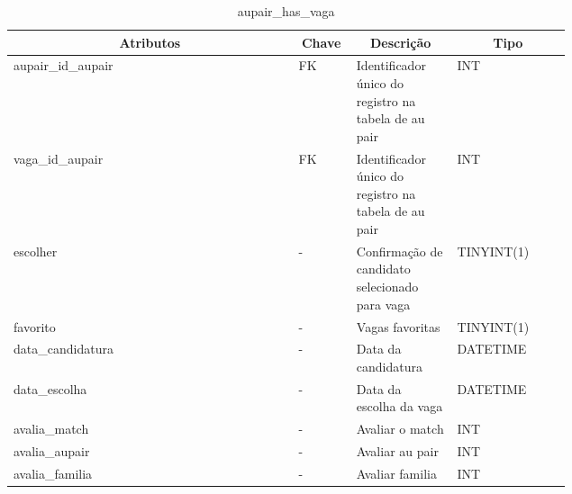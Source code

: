 \begin{enumerate}
    \begin{table}[H]
    \caption{aupair\_has\_vaga}
    \label{idioma}
    	\centering\footnotesize
        \begin{tabular}{|p{0.40\linewidth} | p{0.04\linewidth} |  p{0.12\linewidth} | p{0.16\linewidth} |}  \hline
        \multicolumn{1}{|c|}{\textbf{Atributos}} &
        \multicolumn{1}{|c|}{\textbf{Chave}} &
        \multicolumn{1}{c|}{\textbf{Descrição}} &
        \multicolumn{1}{c|}{\textbf{Tipo}} \\ \hline
          
        aupair\_id\_aupair  &  
        FK & 
        Identificador único do registro na tabela de au pair &
        INT
        \\  \hline
        
        vaga\_id\_aupair  &  
        FK & 
        Identificador único do registro na tabela de au pair &
        INT
        \\  \hline
        
        escolher  &  
        - & 
        Confirmação de candidato selecionado para vaga &
        TINYINT(1)
        \\  \hline
        
        favorito  &  
        - & 
        Vagas favoritas &
        TINYINT(1)
        \\  \hline
        
        data\_candidatura  &  
        - & 
        Data da candidatura &
        DATETIME
        \\  \hline
        
        data\_escolha  &  
        - & 
        Data da escolha da vaga &
        DATETIME
        \\  \hline
        
        avalia\_match  &  
        - & 
        Avaliar o match &
        INT
        \\  \hline
        
        avalia\_aupair  &  
        - & 
        Avaliar au pair &
        INT
        \\  \hline
        
        avalia\_familia  &  
        - & 
        Avaliar familia &
        INT
        \\  \hline
       
       
        \end{tabular}
    \end{table}
\end{enumerate}

